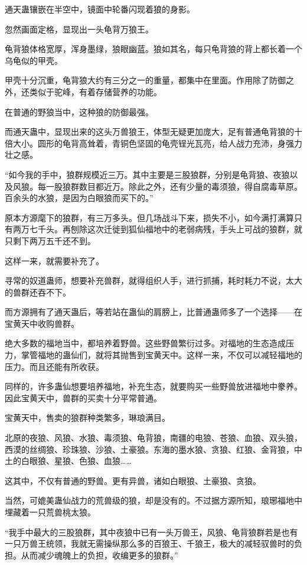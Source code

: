 
\begin{this_body}

通天蛊镶嵌在半空中，镜面中轮番闪现着狼的身影。

忽然画面定格，显现出一头龟背万狼王。

龟背狼体格宽厚，浑身墨绿，狼眼幽蓝。狼如其名，每只龟背狼的背上都长着一个乌龟似的甲壳。

甲壳十分沉重，龟背狼大约有三分之一的重量，都集中在里面。作用除了防御之外，还类似于驼峰，有着存储营养的功能。

在普通的野狼当中，这种狼的防御最强。

而通天蛊中，显现出来的这头万兽狼王，体型无疑更加庞大，足有普通龟背狼的十倍大小。圆形的龟背高耸着，青铜色坚固的龟壳锃光瓦亮，给人战力充沛，身强力壮之感。

“如今我的手中，狼群规模近三万。其中主要是三股狼群，分别是龟背狼、夜狼以及风狼。每一股狼群数目都近万。除此之外，还有少量的毒须狼，得自腐毒草原。百余头的水狼，是因为白眼狼而买下的。”

原本方源麾下的狼群，有三万多头。但几场战斗下来，损失不小，如今满打满算只有两万七千头。再刨除这次迁徙到狐仙福地中的老弱病残，手头上可战的狼群，就只剩下两万五千还不到。

这样一来，就需要补充了。

寻常的奴道蛊师，想要补充兽群，就得组织人手，进行抓捕，耗时耗力不说，太大的兽群还吞不下。

而方源拥有了通天蛊后，等若站在蛊仙的肩膀上，比普通蛊师多了一个选择——在宝黄天中收购兽群。

绝大多数的福地当中，都培养着野兽。这些野兽繁衍过多。对福地的生态造成压力，掌管福地的蛊仙们，就将其抛售到宝黄天中。这样一来，不仅可以减轻福地的压力。而且还能有所收获。

同样的，许多蛊仙想要培养福地，补充生态，就要购买一些野兽放进福地中豢养。因此宝黄天中，兽群的买卖十分平常普通。

宝黄天中，售卖的狼群种类繁多，琳琅满目。

北原的夜狼、风狼、水狼、毒须狼、龟背狼，南疆的电狼、苍狼、血狼、双头狼，西漠的丝绸狼、珍珠狼、沙狼、土豪狼。东海的墨水狼、贪狼、红狼、金背狼，中土的白眼狼、星狼、色狼、血狼……

这其中，不仅有普通的野兽。更有异兽，诸如白眼狼、土豪狼、贪狼。

当然，可媲美蛊仙战力的荒兽级的狼，却是没有的。不过据方源所知，琅琊福地中埋藏着一只荒兽桃太狼。

“我手中最大的三股狼群，其中夜狼中已有一头万兽王，风狼、龟背狼群若是也有一只万兽王统领，我就无需操纵那么多的百狼王、千狼王，极大的减轻驭兽时的负担。从而减少魂魄上的负担，收编更多的狼群。”


\end{this_body}
